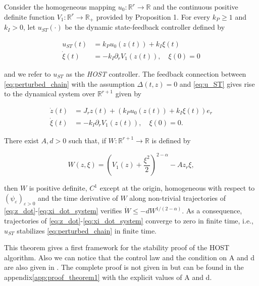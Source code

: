 \begin{theorem}
    Consider the homogeneous mapping $u_0 : \mathbb{R}^r \rightarrow \mathbb{R}$ and the continuous positive 
    definite function $V_1 : \mathbb{R}^r \rightarrow \mathbb{R}_+$ provided by Proposition 1. For every 
    $k_P \geq 1$ and $k_I > 0$, let $u_{ST}(\cdot)$ be the dynamic state-feedback controller defined by

    \begin{align}
        u_{ST}(t) &= k_P u_0(z(t)) + k_I \xi(t) \label{eq:u_ST} \\
        \dot{\xi}(t) &= -k_I \partial_r V_1(z(t)), \quad \xi(0) = 0 \label{eq:xi_dot} 
    \end{align}

    and we refer to $u_{ST}$ as the \textit{HOST} controller. The feedback connection between 
    \ref{eq:perturbed_chain} with the assumption \(\Delta(t, z) = 0\) and \eqref{eq:u_ST} gives rise to the 
    dynamical system over $\mathbb{R}^{r+1}$ given by

    \begin{align}
        \dot{z}(t) &= J_r z(t) + (k_P u_0(z(t)) + k_I \xi(t)) e_r \label{eq:z_dot} \\
        \dot{\xi}(t) &= -k_I \partial_r V_1(z(t)), \quad \xi(0) = 0. \label{eq:xi_dot_system}
    \end{align}

    There exist $A, d > 0$ such that, if $W : \mathbb{R}^{r+1} \rightarrow \mathbb{R}$ is defined by

    \begin{equation}
        W(z, \xi) = \left(V_1(z) + \frac{\xi^2}{2}\right)^{2-\alpha} - A z_r \xi, \label{eq:W}
    \end{equation}

    then $W$ is positive definite, $C^1$ except at the origin, homogeneous with respect 
    to $(\psi_\varepsilon)_{\varepsilon > 0}$ and the time derivative of $W$ along non-trivial 
    trajectories of \eqref{eq:z_dot}-\eqref{eq:xi_dot_system} verifies $\dot{W} \leq -d W^{1/(2-\alpha)}$. 
    As a consequence, trajectories of \eqref{eq:z_dot}-\eqref{eq:xi_dot_system} converge to zero in finite 
    time, i.e., $u_{ST}$ stabilizes \ref{eq:perturbed_chain} in finite time.
\end{theorem}


This theorem gives a first framework for the stability proof of the HOST algorithm. Also we can notice that 
the control law and the condition on A and d are also given in \cite{Laghrouche2017}. The complete proof 
is not given in \cite{Laghrouche2017} but can be found in the appendix\ref{app:proof_theorem1} with 
the explicit values of A and d.

